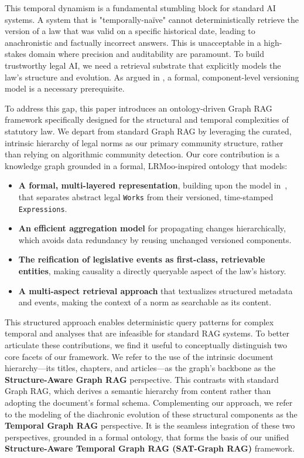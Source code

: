 \documentclass[11pt]{article}
\begin{document}
This temporal dynamism is a fundamental stumbling block for standard AI systems. A system that is "temporally-naïve" cannot deterministically retrieve the version of a law that was valid on a specific historical date, leading to anachronistic and factually incorrect answers. This is unacceptable in a high-stakes domain where precision and auditability are paramount. To build trustworthy legal AI, we need a retrieval substrate that explicitly models the law's structure and evolution. As argued in \cite{demartim2025temporal}, a formal, component-level versioning model is a necessary prerequisite.

To address this gap, this paper introduces an ontology-driven Graph RAG framework specifically designed for the structural and temporal complexities of statutory law. We depart from standard Graph RAG \cite{edge2024graphrag} by leveraging the curated, intrinsic hierarchy of legal norms as our primary community structure, rather than relying on algorithmic community detection. Our core contribution is a knowledge graph grounded in a formal, LRMoo-inspired ontology \cite{lrmoo2024} that models:
\begin{itemize}
    \item \textbf{A formal, multi-layered representation}, building upon the model in~\cite{demartim2025temporal}, that separates abstract legal \texttt{Works} from their versioned, time-stamped \texttt{Expressions}.
    
    \item \textbf{An efficient aggregation model} for propagating changes hierarchically, which avoids data redundancy by reusing unchanged versioned components.
    
    \item \textbf{The reification of legislative events as first-class, retrievable entities}, making causality a directly queryable aspect of the law's history.
    
    \item \textbf{A multi-aspect retrieval approach} that textualizes structured metadata and events, making the context of a norm as searchable as its content.
\end{itemize}

This structured approach enables deterministic query patterns for complex temporal and analyses that are infeasible for standard RAG systems. To better articulate these contributions, we find it useful to conceptually distinguish two core facets of our framework. We refer to the use of the intrinsic document hierarchy—its titles, chapters, and articles—as the graph's backbone as the \textbf{Structure-Aware Graph RAG} perspective. This contrasts with standard Graph RAG, which derives a semantic hierarchy from content rather than adopting the document's formal schema. Complementing our approach, we refer to the modeling of the diachronic evolution of these structural components as the \textbf{Temporal Graph RAG} perspective. It is the seamless integration of these two perspectives, grounded in a formal ontology, that forms the basis of our unified \textbf{Structure-Aware Temporal Graph RAG (SAT-Graph RAG)} framework.
\end{document}
